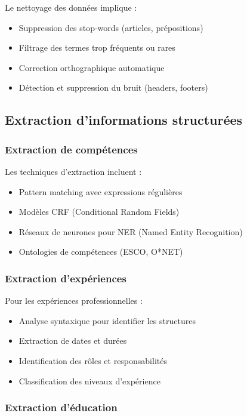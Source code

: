 \documentclass[12pt,a4paper]{report}
\begin{document}
Le nettoyage des données implique :
\begin{itemize}
\item Suppression des stop-words (articles, prépositions)
\item Filtrage des termes trop fréquents ou rares
\item Correction orthographique automatique
\item Détection et suppression du bruit (headers, footers)
\end{itemize}

\subsection{Extraction d'informations structurées}

\subsubsection{Extraction de compétences}

Les techniques d'extraction incluent :
\begin{itemize}
\item Pattern matching avec expressions régulières
\item Modèles CRF (Conditional Random Fields)
\item Réseaux de neurones pour NER (Named Entity Recognition)
\item Ontologies de compétences (ESCO, O*NET)
\end{itemize}

\subsubsection{Extraction d'expériences}

Pour les expériences professionnelles :
\begin{itemize}
\item Analyse syntaxique pour identifier les structures
\item Extraction de dates et durées
\item Identification des rôles et responsabilités
\item Classification des niveaux d'expérience
\end{itemize}

\subsubsection{Extraction d'éducation}
\end{document}
